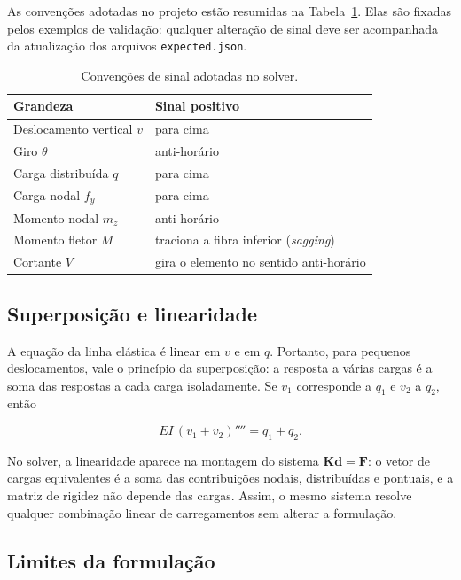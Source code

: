 \documentclass[12pt,a4paper]{article}
\begin{document}
As convenções adotadas no projeto estão resumidas na Tabela~\ref{tab:sinais}. Elas são fixadas pelos exemplos de validação: qualquer alteração de sinal deve ser acompanhada da atualização dos arquivos \texttt{expected.json}.

\begin{table}[H]
  \centering
  \caption{Convenções de sinal adotadas no solver.}
  \label{tab:sinais}
  \begin{tabular}{@{}ll@{}}
    \toprule
    Grandeza & Sinal positivo \\
    \midrule
    Deslocamento vertical \(v\) & para cima \\
    Giro \(\theta\) & anti-horário \\
    Carga distribuída \(q\) & para cima \\
    Carga nodal \(f_y\) & para cima \\
    Momento nodal \(m_z\) & anti-horário \\
    Momento fletor \(M\) & traciona a fibra inferior (\emph{sagging}) \\
    Cortante \(V\) & gira o elemento no sentido anti-horário \\
    \bottomrule
  \end{tabular}
\end{table}

\subsection{Superposição e linearidade}
\label{sec:superposicao}

A equação da linha elástica é linear em \(v\) e em \(q\). Portanto, para pequenos deslocamentos, vale o princípio da superposição: a resposta a várias cargas é a soma das respostas a cada carga isoladamente. Se \(v_1\) corresponde a \(q_1\) e \(v_2\) a \(q_2\), então

\begin{equation}
  EI\,(v_1+v_2)'''' = q_1+q_2.
  \label{eq:superposicao}
\end{equation}

No solver, a linearidade aparece na montagem do sistema \(\mathbf{K}\mathbf{d}=\mathbf{F}\): o vetor de cargas equivalentes é a soma das contribuições nodais, distribuídas e pontuais, e a matriz de rigidez não depende das cargas. Assim, o mesmo sistema resolve qualquer combinação linear de carregamentos sem alterar a formulação.

\subsection{Limites da formulação}
\label{sec:limites}
\end{document}
